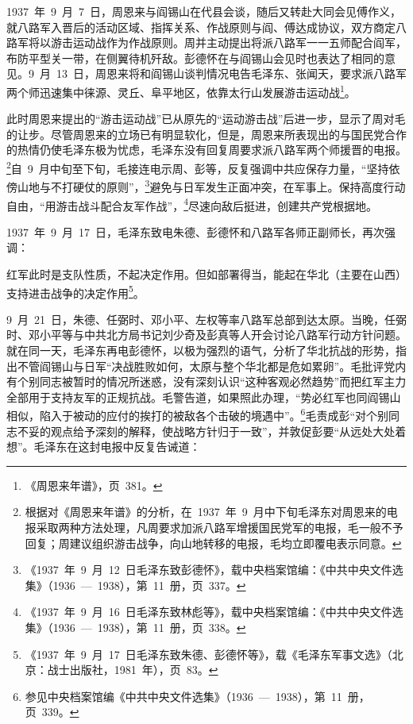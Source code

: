 1937~年~9~月~7~日，周恩来与阎锡山在代县会谈，随后又转赴大同会见傅作义，就八路军入晋后的活动区域、指挥关系、作战原则与阎、傅达成协议，双方商定八路军将以游击运动战作为作战原则。周并主动提出将派八路军一一五师配合阎军，布防平型关一带，在侧翼待机歼敌。彭德怀在与阎锡山会见时也表达了相同的意见。9~月~13~日，周恩来将和阎锡山谈判情况电告毛泽东、张闻天，要求派八路军两个师迅速集中徕源、灵丘、阜平地区，依靠太行山发展游击运动战\footnote{《周恩来年谱》，页~381。}。

此时周恩来提出的“游击运动战”已从原先的“运动游击战”后进一步，显示了周对毛的让步。尽管周恩来的立场已有明显软化，但是，周恩来所表现出的与国民党合作的热情仍使毛泽东极为忧虑，毛泽东没有回复周要求派八路军两个师援晋的电报。\footnote{根据对《周恩来年谱》的分析，在~1937~年~9~月中下旬毛泽东对周恩来的电报采取两种方法处理，凡周要求加派八路军增援国民党军的电报，毛一般不予回复；周建议组织游击战争，向山地转移的电报，毛均立即覆电表示同意。}自~9~月中旬至下旬，毛接连电示周、彭等，反复强调中共应保存力量，“坚持依傍山地与不打硬仗的原则”，\footnote{《1937~年~9~月~12~日毛泽东致彭德怀》，载中央档案馆编：《中共中央文件选集》（1936~—~1938），第~11~册，页~337。}避免与日军发生正面冲突，在军事上。保持高度行动自由，“用游击战斗配合友军作战”，\footnote{《1937~年~9~月~16~日毛泽东致林彪等》，载中央档案馆编：《中共中央文件选集》（1936~—~1938），第~11~册，页~338。}尽速向敌后挺进，创建共产党根据地。

1937~年~9~月~17~日，毛泽东致电朱德、彭德怀和八路军各师正副师长，再次强调：

\begin{quoting}
红军此时是支队性质，不起决定作用。但如部署得当，能起在华北（主要在山西）支持进击战争的决定作用\footnote{《1937~年~9~月~17~日毛泽东致朱德、彭德怀等》，载《毛泽东军事文选》（北京：战士出版社，1981~年），页~83。}。
\end{quoting}

9~月~21~日，朱德、任弼时、邓小平、左权等率八路军总部到达太原。当晚，任弼时、邓小平等与中共北方局书记刘少奇及彭真等人开会讨论八路军行动方针问题。就在同一天，毛泽东再电彭德怀，以极为强烈的语气，分析了华北抗战的形势，指出不管阎锡山与日军“决战胜败如何，太原与整个华北都是危如累卵”。毛批评党内有个别同志被暂时的情况所迷惑，没有深刻认识“这种客观必然趋势”而把红军主力全部用于支持友军的正规抗战。毛警告道，如果照此办理，“势必红军也同阎锡山相似，陷入于被动的应付的挨打的被敌各个击破的境遇中”。\footnote{参见中央档案馆编《中共中央文件选集》（1936~—~1938），第~11~册，页~339。}毛责成彭“对个别同志不妥的观点给予深刻的解释，使战略方针归于一致”，并敦促彭要“从远处大处着想”。毛泽东在这封电报中反复告诫道：


